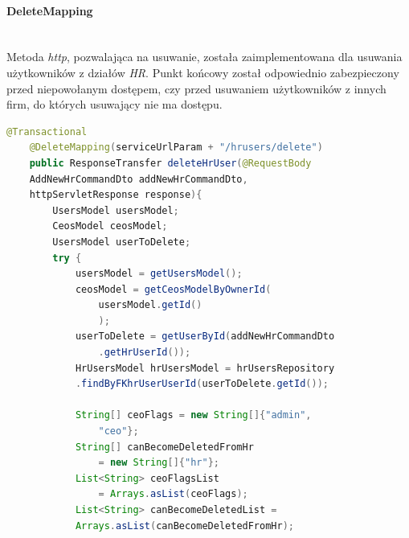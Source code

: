 \documentclass[twoside]{projektInzynierskiMS}
\numberwithin{figure}{section}
\begin{document}
\paragraph{DeleteMapping}
\mbox{} \\ \indent
Metoda \textit{http}, pozwalająca na usuwanie, została zaimplementowana dla usuwania użytkowników z działów \textit{HR}. Punkt końcowy został odpowiednio zabezpieczony przed niepowołanym dostępem, czy przed usuwaniem użytkowników z innych firm, do których usuwający nie ma dostępu.
\newline

\begin{lstlisting}[language=Java,caption=Implementacja metody DELETE na przykładzie usunięcia użytkownika z działu HR. Źródło: Opracowanie własne.,captionpos=b]
    @Transactional
    @DeleteMapping(serviceUrlParam + "/hrusers/delete")
    public ResponseTransfer deleteHrUser(@RequestBody 
    AddNewHrCommandDto addNewHrCommandDto,
    httpServletResponse response){
        UsersModel usersModel;
        CeosModel ceosModel;
        UsersModel userToDelete;
        try {
            usersModel = getUsersModel();
            ceosModel = getCeosModelByOwnerId(
                usersModel.getId()
                );
            userToDelete = getUserById(addNewHrCommandDto
                .getHrUserId());
            HrUsersModel hrUsersModel = hrUsersRepository
            .findByFKhrUserUserId(userToDelete.getId());

            String[] ceoFlags = new String[]{"admin", 
                "ceo"};
            String[] canBecomeDeletedFromHr 
                = new String[]{"hr"};
            List<String> ceoFlagsList 
                = Arrays.asList(ceoFlags);
            List<String> canBecomeDeletedList =
            Arrays.asList(canBecomeDeletedFromHr);


\end{lstlisting}
\end{document}
